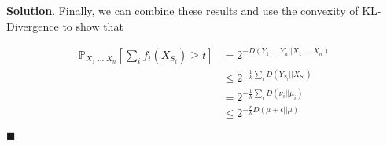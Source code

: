 \documentclass[12pt]{article}
\theoremstyle{definition}
\newenvironment{s}{%
        \begin{trivlist} \item \textbf{Solution}. }{%
            \hspace*{\fill} $\blacksquare$\end{trivlist}}%
\begin{document}
{\begin{s}
Finally, we can combine these results and use the convexity of KL-Divergence to show that

\begin{align*}
\mathbb{P}_{X_{1}\; ... \; X_{n}} \left[\sum_{i} f_{i}(X_{S_{i}}) \geq t\right] &= 2^{-D(Y_{1} \; ... \; Y_{n}||X_{1} \; ... \; X_{n})}\\
&\leq 2^{-\frac{1}{k}\sum_{i} D(Y_{S_{i}}||X_{S_{i}})}\\
&= 2^{-\frac{1}{k}\sum_{i} D(\nu_{i}||\mu_{i})}\\
&\leq 2^{-\frac{r}{k}D(\mu + \epsilon||\mu)}
\end{align*}


\end{s}
\end{document}
